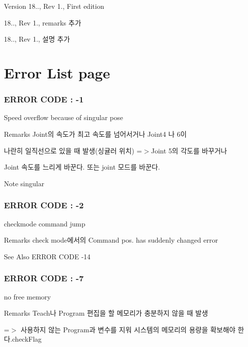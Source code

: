 \begin{DoxyVersion}{Version}
18.., Rev 1., First edition 

18.., Rev 1., remarks 추가 

18.., Rev 1., 설명 추가
\end{DoxyVersion}
\section*{Error List page }



 \subsubsection*{E\-R\-R\-O\-R C\-O\-D\-E \-: -\/1 }

Speed overflow because of singular pose \begin{DoxyRemark}{Remarks}
Joint의 속도가 최고 속도를 넘어서거나 Joint4 나 6이 \par
 나란히 일직선으로 있을 때 발생(싱귤러 위치) =$>$Joint 5의 각도를 바꾸거나 \par
 Joint 속도를 느리게 바꾼다. 또는 joint 모드를 바꾼다. 
\end{DoxyRemark}
\begin{DoxyNote}{Note}
singular
\end{DoxyNote}


 \subsubsection*{E\-R\-R\-O\-R C\-O\-D\-E \-: -\/2 }

checkmode command jump \begin{DoxyRemark}{Remarks}
check mode에서의 Command pos. has suddenly changed error 
\end{DoxyRemark}
\begin{DoxySeeAlso}{See Also}
E\-R\-R\-O\-R C\-O\-D\-E -\/14
\end{DoxySeeAlso}


 \subsubsection*{E\-R\-R\-O\-R C\-O\-D\-E \-: -\/7 }

no free memory \begin{DoxyRemark}{Remarks}
Teach나 Program 편집을 할 메모리가 충분하지 않을 때 발생\par
 =$>$ 사용하지 않는 Program과 변수를 지워 시스템의 메모리의 용량을 확보해야 한다.\-check\-Flag
\end{DoxyRemark}


